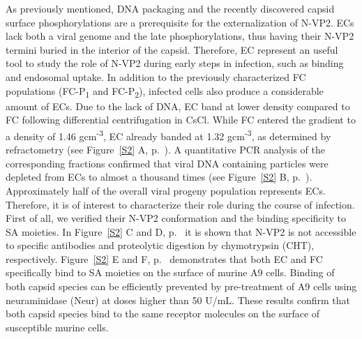 As previously mentioned, DNA packaging and the recently discovered capsid surface phosphorylations are a prerequisite for the externalization of N-VP2. ECs lack both a viral genome and the late phosphorylations, thus having their N-VP2 termini buried in the interior of the capsid. Therefore, EC represent an useful tool to study the role of N-VP2 during early steps in infection, such as binding and endosomal uptake. In addition to the previously characterized FC populations (FC-P\textsubscript{1} and FC-P\textsubscript{2}), infected cells also produce a considerable amount of ECs. Due to the lack of DNA, EC band at lower density compared to FC following differential centrifugation in CsCl. While FC entered the gradient to a density of 1.46 gcm\textsuperscript{-3}, EC already banded at 1.32 gcm\textsuperscript{-3}, as determined by refractometry (see Figure~\ref{S2} A, p.~\pageref{S2}). A quantitative PCR analysis of the corresponding fractions confirmed that viral DNA containing particles were depleted from ECs to almost a thousand times (see Figure~\ref{S2} B, p.~\pageref{S2}). Approximately half of the overall viral progeny population represents ECs. Therefore, it is of interest to characterize their role during the course of infection. First of all, we verified their N-VP2 conformation and the binding specificity to SA moieties. In Figure~\ref{S2} C and D, p.~\pageref{S2} it is shown that N-VP2 is not accessible to specific antibodies and proteolytic digestion by chymotrypsin (CHT), respectively. Figure~\ref{S2} E and F, p.~\pageref{S2} demonstrates that both EC and FC specifically bind to SA moieties on the surface of murine A9 cells. Binding of both capsid species can be efficiently prevented by pre-treatment of A9 cells using neuraminidase (Neur) at doses higher than 50 U/mL. These results confirm that both capsid species bind to the same receptor molecules on the surface of susceptible murine cells.           


 



